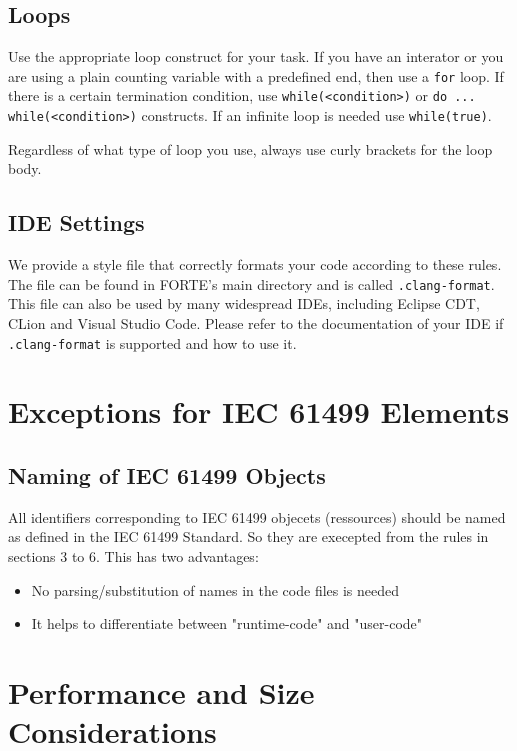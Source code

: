 \documentclass[final,a4paper,10pt, oneside]{article}
\begin{document}
\subsection{Loops}
Use the appropriate loop construct for your task.
If you have an interator or you are using a plain counting variable with a predefined end, then use a \verb|for| loop.
If there is a certain termination condition, use \verb|while(<condition>)| or \verb|do ... while(<condition>)| constructs.
If an infinite loop is needed use \verb|while(true)|.

Regardless of what type of loop you use, always use curly brackets for the loop body.

\subsection{IDE Settings}
We provide a style file that correctly formats your code according to these rules.
The file can be found in FORTE's main directory and is called \verb=.clang-format=.
This file can also be used by many widespread IDEs, including Eclipse CDT, CLion and Visual Studio Code.
Please refer to the documentation of your IDE if \verb=.clang-format= is supported and how to use it.

\section{Exceptions for IEC 61499 Elements}

\subsection{Naming of IEC 61499 Objects}

All identifiers corresponding to IEC 61499 objecets (ressources) should be named as defined
in the IEC 61499 Standard. So they are execepted from the rules in sections 3 to 6. This has two advantages:
\begin{itemize}
\item No parsing/substitution of names in the code files is needed
\item It helps to differentiate between "runtime-code" and "user-code"
\end{itemize}

\section{Performance and Size Considerations}
\end{document}
